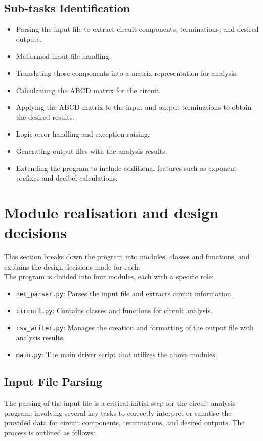 \documentclass[a4paper]{article}
\begin{document}
\subsection{Sub-tasks Identification}
\begin{itemize}
    \item Parsing the input file to extract circuit components, terminations, and desired outputs.
    \item Malformed input file handling.
    \item Translating those components into a matrix representation for analysis.
    \item Calculatinng the ABCD matrix for the circuit.
    \item Applying the ABCD matrix to the input and output terminations to obtain the desired results.
    \item Logic error handling and exception raising.
    \item Generating output files with the analysis results.
    \item Extending the program to include additional features such as exponent prefixes and decibel calculations.
\end{itemize}

\newpage
\section{Module realisation and design decisions}
This section breaks down the program into modules, classes and functions, and explains the design decisions made for each.\\
The program is divided into four modules, each with a specific role:
\begin{itemize}
    \item \texttt{net\_parser.py}: Parses the input file and extracts circuit information.
    \item \texttt{circuit.py}: Contains classes and functions for circuit analysis.
    \item \texttt{csv\_writer.py}: Manages the creation and formatting of the output file with analysis results.
    \item \texttt{main.py}: The main driver script that utilizes the above modules.
\end{itemize}

\subsection*{Input File Parsing}
The parsing of the input file is a critical initial step for the circuit analysis program,
 involving several key tasks to correctly interpret or sanatise the provided data for circuit components,
  terminations, and desired outputs. The process is outlined as follows:
\end{document}
